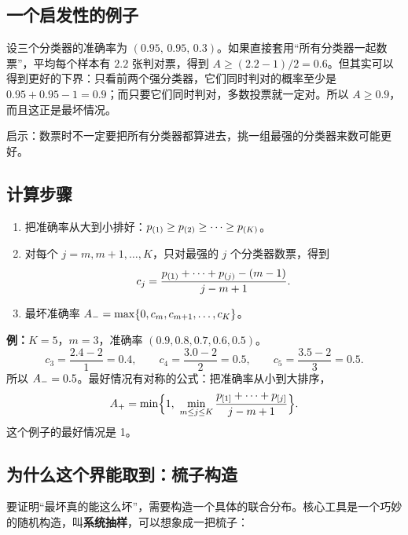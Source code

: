 \documentclass[11pt]{article}
\begin{document}
\subsection{一个启发性的例子}
设三个分类器的准确率为 $(0.95,\,0.95,\,0.3)$。如果直接套用“所有分类器一起数票”，平均每个样本有 $2.2$ 张判对票，得到 $A\ge(2.2-1)/2=0.6$。但其实可以得到更好的下界：只看前两个强分类器，它们同时判对的概率至少是 $0.95+0.95-1=0.9$；而只要它们同时判对，多数投票就一定对。所以 $A\ge0.9$，而且这正是最坏情况。

启示：数票时不一定要把所有分类器都算进去，挑一组最强的分类器来数可能更好。

\subsection{计算步骤}
\begin{goodbox}[title=最坏情况的计算方法]
\begin{enumerate}[leftmargin=1.6em]
\item 把准确率从大到小排好：$p_{(1)}\ge p_{(2)}\ge\dots\ge p_{(K)}$。
\item 对每个 $j=m,m+1,\dots,K$，只对最强的 $j$ 个分类器数票，得到
\[
c_j=\frac{p_{(1)}+\dots+p_{(j)}-(m-1)}{j-m+1}.
\]
\item 最坏准确率 $A_{-}=\max\{0,c_m,c_{m+1},\dots,c_K\}$。
\end{enumerate}
\end{goodbox}

\textbf{例：}$K=5$，$m=3$，准确率 $(0.9,0.8,0.7,0.6,0.5)$。
\[
c_3=\frac{2.4-2}{1}=0.4,\qquad c_4=\frac{3.0-2}{2}=0.5,\qquad c_5=\frac{3.5-2}{3}=0.5 .
\]
所以 $A_{-}=0.5$。最好情况有对称的公式：把准确率从小到大排序，
\[
A_{+}=\min\Bigl\{1,\ \min_{m\le j\le K}\frac{p_{[1]}+\dots+p_{[j]}}{j-m+1}\Bigr\}.
\]
这个例子的最好情况是 1。

\subsection{为什么这个界能取到：梳子构造}
要证明“最坏真的能这么坏”，需要构造一个具体的联合分布。核心工具是一个巧妙的随机构造，叫\textbf{系统抽样}，可以想象成一把梳子：
\end{document}
